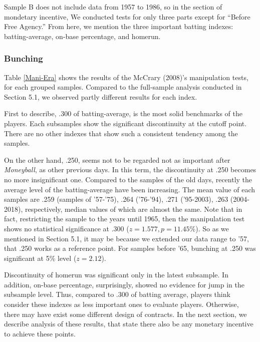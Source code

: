 \documentclass[dvipdfmx, 12pt]{article}
\begin{document}
Sample B does not include data from 1957 to 1986, so in the section of mondetary incentive, We conducted tests for only three parts except for ``Before Free Agency.'' From here, we mention the three important batting indexes: batting-average, on-base percentage, and homerun.

\subsubsection{Bunching}

Table \ref{Mani-Era} shows the results of the McCrary (2008)'s manipulation tests, for each grouped samples. Compared to the full-sample analysis conducted in Section 5.1, we observed partly different results for each index.

First to describe, .300 of batting-average, is the most solid benchmarks of the players. Each subsamples show the significant discontinuity at the cutoff point. There are no other indexes that show such a consistent tendency among the samples.


On the other hand, .250, seems not to be regarded not as important  after \textit{Moneyball}, as other previous days. In this term, the discontinuity at .250 becomes no more insignificant one. Compared to the samples of the old days, recently the average level of the batting-average have been increasing. The mean value of each samples are .259 (samples of '57-'75), .264 ('76-'94), .271 ('95-2003), .263 (2004-2018), respectively, median values of which are almost the same. Note that in fact, restricting the sample to the years until 1965, then the manipulation test shows no statistical significance at .300 ($z = 1.577, p = 11.45\% $). So as we mentioned in Section 5.1, it may be because we extended our data range to '57, that .250 works as a reference point. For samples before '65, bunching at .250 was significant at 5\% level ($z = 2.12$).

Discontinuity of homerun was significant only in the latest subsample. In addition, on-base percentage, surprisingly, showed no evidence for jump in the subsample level. Thus, compared to .300 of batting average, players think consider these indexes as less important ones to evaluate players. Otherwise, there may have exist some different design of contracts. In the next section, we describe analysis of these results, that state there also be any monetary incentive to achieve these points.
\end{document}
